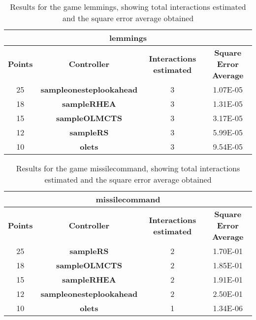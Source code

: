 \begin{table*}[!t]
\begin{center}
\begin{adjustbox}{width=1\textwidth}
\begin{tabular}{|c|c|c|c|}
\hline
\multicolumn{4}{|c|}{\textbf{lemmings}}\\
\hline
\textbf{Points} & \textbf{Controller} & \textbf{Interactions estimated} & \textbf{Square Error Average}\\
\hline
25 & \textbf{sampleonesteplookahead} & 3 & 1.07E-05
 \\
\hline
18 & \textbf{sampleRHEA} & 3 & 1.31E-05
 \\
\hline
15 & \textbf{sampleOLMCTS} & 3 & 3.17E-05
 \\
\hline
12 & \textbf{sampleRS} & 3 & 5.99E-05
 \\
\hline
10 & \textbf{olets} & 3 & 9.54E-05
 \\
\hline
\end{tabular}
\end{adjustbox}
\caption{Results for the game lemmings, showing total interactions estimated and the square error average obtained}
\label{tab:weights}
\end{center}
\end{table*}
\begin{table*}[!t]
\begin{center}
\begin{adjustbox}{width=1\textwidth}
\begin{tabular}{|c|c|c|c|}
\hline
\multicolumn{4}{|c|}{\textbf{missilecommand}}\\
\hline
\textbf{Points} & \textbf{Controller} & \textbf{Interactions estimated} & \textbf{Square Error Average}\\
\hline
25 & \textbf{sampleRS} & 2 & 1.70E-01
 \\
\hline
18 & \textbf{sampleOLMCTS} & 2 & 1.85E-01
 \\
\hline
15 & \textbf{sampleRHEA} & 2 & 1.91E-01
 \\
\hline
12 & \textbf{sampleonesteplookahead} & 2 & 2.50E-01
 \\
\hline
10 & \textbf{olets} & 1 & 1.34E-06
 \\
\hline
\end{tabular}
\end{adjustbox}
\caption{Results for the game missilecommand, showing total interactions estimated and the square error average obtained}
\label{tab:weights}
\end{center}
\end{table*}
